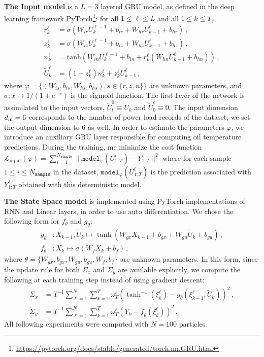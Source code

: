\documentclass[journal]{IEEEtran}
\begin{document}
\textbf{The Input model} is a $L=3$ layered GRU model, as defined in the deep learning framework PyTorch\footnote{\href{https://pytorch.org/docs/stable/generated/torch.nn.GRU.html}{https://pytorch.org/docs/stable/generated/torch.nn.GRU.html}}: for all $1 \leq \ell \leq L$ and all $1 \leq k \leq T$,
\begin{align*}
	r^\ell_k        & = \sigma(W_{ir} U^{\ell - 1}_k + b_{ir} + W_{hr} U^{\ell}_{k-1} + b_{hr}) \,,                \\
	z^\ell_k        & = \sigma(W_{iz} U^{\ell - 1}_k + b_{iz} + W_{hz} U^{\ell}_{k-1} + b_{hz}) \,,                \\
	n^\ell_k        & = \mathrm{tanh}(W_{in} U^{\ell - 1}_k + b_{in} + r^\ell_k (W_{hn} U^\ell_{k-1} + b_{hn}))\,, \\
	\tilde U^\ell_k & = (1-z^\ell_k) n^\ell_k+z^\ell_k U^\ell_{k-1}\,,
\end{align*}
where $\varphi = \{(W_{is}, b_{is}, W_{hs}, b_{hs}), s \in \{r, z, n\}\}$ are unknown parameters, and $\sigma: x \mapsto 1/(1+\mathrm{e}^{-x})$ is the sigmoid function.
The first layer of the network is assimilated to the input vectors, $\widetilde U_t^0 \equiv U_k$ and $\widetilde U^\ell_0 \equiv 0$.
The input dimension $d_\textnormal{in}=6$ corresponds to the number of power load records of the dataset, we set the output dimension to 6 as well.
In order to estimate the parameters $\varphi$, we introduce an auxiliary GRU layer responsible for computing oil temperature predictions.
During the training, me minimize the cost function $\mathcal{L}_{\mathrm{input}}(\varphi) = \sum_{i=1}^{N_{\texttt{sample}}} \|\texttt{model}_{\varphi}(U^i_{1:T}) - Y^i_{1:T}\|^2$ where for each sample $1 \leq i \leq N_{\texttt{sample}}$ in the dataset, $\texttt{model}_\varphi(U^i_{1:T})$ is the prediction associated with $Y^i_{1:T}$ obtained with this deterministic model.

\textbf{The State Space model} is implemented using PyTorch implementations of  RNN and Linear layers, in order to use auto differentiation.
We chose the following form for $f_\theta$ and $g_\theta$:
\begin{align*}
	g_\theta & : X_{k-1}, \widetilde U_k \mapsto \tanh(W_{gx} X_{k-1} + b_{gx} + W_{gu} \widetilde U_k + b_{gu})\,, \\
	f_\theta & : X_k \mapsto  \sigma(W_f X_k + b_f)\,,
\end{align*}
where $\theta = \{W_{gx}, b_{gx}, W_{gu}, b_{gu}, W_f, b_f\}$ are unknown parameters.
In this form, since the update rule for both $\Sigma_x$ and $\Sigma_y$ are available explicitly, we compute the following at each training step instead of using gradient descent:
\begin{align*}
	\Sigma_x & = T^{-1} \sum_{\ell=1}^N \sum_{k=1}^T \omega_T^\ell (\tanh^{-1}(\xi_k^\ell) - g_{\hat \theta}(\xi^\ell_{k-1}, \widetilde U_k))^2\,, \\
	\Sigma_y & = T^{-1} \sum_{\ell=1}^N \sum_{k=1}^T \omega_T^\ell (Y_k - f_{\hat \theta}(\xi^\ell_k))^2 \,.
\end{align*}
All following experiments were computed with $N=100$ particles.
\end{document}
